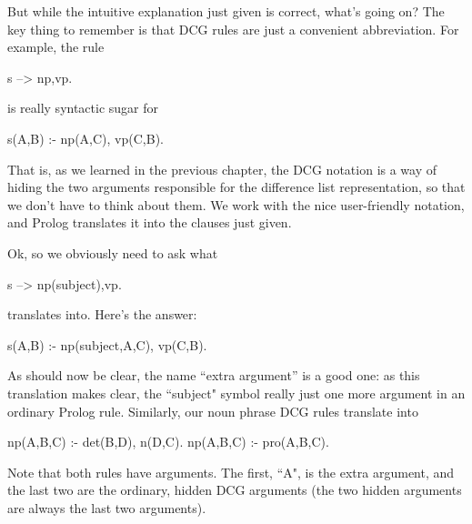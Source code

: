 But while the intuitive explanation just given is correct, what's
 going on?  The key thing to remember is that DCG
rules are just a convenient abbreviation.  For example, the
rule
\begin{LPNcodedisplay}
s --> np,vp.
\end{LPNcodedisplay}
is really syntactic sugar for
\begin{LPNcodedisplay}
s(A,B) :-
    np(A,C),
    vp(C,B).
\end{LPNcodedisplay}
That is, as we learned in the previous chapter, the DCG notation is a
way of hiding the two arguments responsible for the difference list
representation, so that we don't have to think about them.  We work
with the nice user-friendly notation, and Prolog translates it into
the clauses just given.

Ok, so we obviously need to ask what
\begin{LPNcodedisplay}
s --> np(subject),vp.
\end{LPNcodedisplay}
translates into. Here's the answer:
\begin{LPNcodedisplay}
s(A,B) :-
    np(subject,A,C),
    vp(C,B).
\end{LPNcodedisplay}

As should now be clear, the name ``extra argument'' is a good one: as
this translation makes clear, the ``subject" symbol really
 just one more argument in an ordinary Prolog rule.
Similarly, our noun phrase DCG rules translate into
\begin{LPNcodedisplay}
np(A,B,C) :-
    det(B,D),
    n(D,C).
np(A,B,C) :-
    pro(A,B,C).
\end{LPNcodedisplay}
Note that both rules have  arguments.  The first, ``A",
is the extra argument, and the last two are the ordinary, hidden DCG
arguments (the two hidden arguments are always the last two
arguments).

